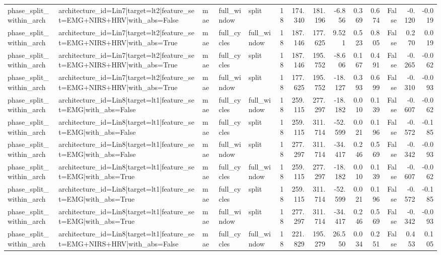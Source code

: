 \begin{table}
\begin{tabular}{lllllrrrrrrrrr}
phase_split_within_arch & architecture_id=Lin7|target=lt2|feature_set=EMG+NIRS+HRV|with_abs=False & mae & full_window & split & 18 & 174.340 & 181.196 & -6.856 & 0.369 & 0.674 & False & -0.120 & -0.019 \\
phase_split_within_arch & architecture_id=Lin7|target=lt2|feature_set=EMG+NIRS+HRV|with_abs=True & mae & full_cycles & full_window & 18 & 187.146 & 177.625 & 9.521 & 0.523 & 0.805 & False & 0.270 & 0.019 \\
phase_split_within_arch & architecture_id=Lin7|target=lt2|feature_set=EMG+NIRS+HRV|with_abs=True & mae & full_cycles & split & 18 & 187.146 & 195.752 & -8.606 & 0.167 & 0.491 & False & -0.265 & -0.062 \\
phase_split_within_arch & architecture_id=Lin7|target=lt2|feature_set=EMG+NIRS+HRV|with_abs=True & mae & full_window & split & 18 & 177.625 & 195.752 & -18.127 & 0.393 & 0.699 & False & -0.310 & -0.093 \\
phase_split_within_arch & architecture_id=Lin8|target=lt1|feature_set=EMG|with_abs=False & mae & full_cycles & full_window & 18 & 259.115 & 277.297 & -18.182 & 0.010 & 0.139 & False & -0.607 & -0.062 \\
phase_split_within_arch & architecture_id=Lin8|target=lt1|feature_set=EMG|with_abs=False & mae & full_cycles & split & 18 & 259.115 & 311.714 & -52.599 & 0.021 & 0.196 & False & -0.572 & -0.185 \\
phase_split_within_arch & architecture_id=Lin8|target=lt1|feature_set=EMG|with_abs=False & mae & full_window & split & 18 & 277.297 & 311.714 & -34.417 & 0.246 & 0.569 & False & -0.342 & -0.093 \\
phase_split_within_arch & architecture_id=Lin8|target=lt1|feature_set=EMG|with_abs=True & mae & full_cycles & full_window & 18 & 259.115 & 277.297 & -18.182 & 0.010 & 0.139 & False & -0.607 & -0.062 \\
phase_split_within_arch & architecture_id=Lin8|target=lt1|feature_set=EMG|with_abs=True & mae & full_cycles & split & 18 & 259.115 & 311.714 & -52.599 & 0.021 & 0.196 & False & -0.572 & -0.185 \\
phase_split_within_arch & architecture_id=Lin8|target=lt1|feature_set=EMG|with_abs=True & mae & full_window & split & 18 & 277.297 & 311.714 & -34.417 & 0.246 & 0.569 & False & -0.342 & -0.093 \\
phase_split_within_arch & architecture_id=Lin8|target=lt1|feature_set=EMG+NIRS+HRV|with_abs=False & mae & full_cycles & full_window & 18 & 221.829 & 195.279 & 26.550 & 0.034 & 0.251 & False & 0.453 & 0.105 \\

\end{tabular}
\end{table}
